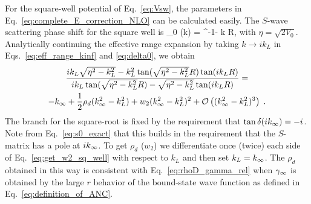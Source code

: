 	For the square-well potential of Eq.~\eqref{eq:Vsw}, the parameters in
	Eq.~\eqref{eq:complete_E_correction_NLO} can be calculated easily.
	The $S$-wave scattering phase shift for	the square well is
	\beq
	 \delta_0 (k) =
	  \tan^{-1} - k R\;,
	  \label{eq:delta0}
	\eeq
	with $\eta = \sqrt{2 V_0}$. 	Analytically continuing the effective
	range expansion by taking $k \rightarrow i k_L$
	in Eqs.~\eqref{eq:eff_range_kinf} and \eqref{eq:delta0}, we obtain
  \begin{multline}
	{i k_L \sqrt{\eta^2 - k_L^2} -k_L^2 \tan( \sqrt{\eta^2 - k_L^2} R)
	\tan(i k_L R) \over i k_L \tan(\sqrt{\eta^2 - k_L^2} R) -
	\sqrt{\eta^2 - k_L^2} \tan(i k_L R) }
	=  \\
	-k_{\infty}
	+ \frac12{\rho_d} (k_{\infty}^2-k_L^2) + w_2 (k_{\infty}^2 - k_L^2)^2
	+ \mathcal{O}\left((k_{\infty}^2-k_L^2)^3\right)	\;.
	\label{eq:get_w2_sq_well}
	\end{multline}
	The branch for the square-root is fixed by the requirement that
	$\tan \delta (ik_{\infty}) = -i$.  Note from Eq.~\eqref{eq:s0_exact} that
	this builds in the requirement that the $S$-matrix has a pole at
	$i k_{\infty}$.  To get $\rho_d$ ($w_2$) we differentiate once (twice) each
	side of Eq.~\eqref{eq:get_w2_sq_well} with
	respect to $k_L$ and then set $k_L = k_{\infty}$.  The $\rho_d$ obtained in
	this way is consistent with Eq.~\eqref{eq:rhoD_gamma_rel} when $\gamma_\infty$
	is obtained by the large $r$ behavior of the bound-state wave function
	as defined in Eq.~\eqref{eq:definition_of_ANC}.

